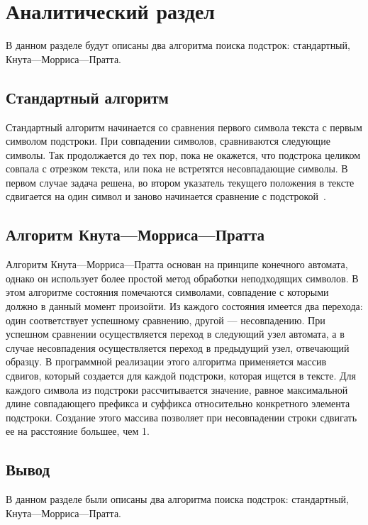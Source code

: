 \chapter{Аналитический раздел}

В данном разделе будут описаны два алгоритма поиска подстрок: стандартный, Кнута---Морриса---Пратта.

\section{Стандартный алгоритм}
Стандартный алгоритм начинается со сравнения первого символа текста с первым символом подстроки. 
При совпадении символов, сравниваются следующие символы. 
Так продолжается до тех пор, пока не окажется, что подстрока целиком совпала с отрезком текста, или пока не встретятся несовпадающие символы. 
В первом случае задача решена, во втором указатель текущего положения в тексте сдвигается на один символ и заново начинается сравнение с подстрокой~\cite{aa}.

\section{Алгоритм Кнута---Морриса---Пратта}
Алгоритм Кнута---Морриса---Пратта основан на принципе конечного автомата, однако он использует более простой метод обработки неподходящих символов.
В этом алгоритме состояния помечаются символами, совпадение с которыми должно в данный момент произойти. 
Из каждого состояния имеется два перехода: один соответствует успешному сравнению, другой --- несовпадению. 
При успешном сравнении осуществляется переход в следующий узел автомата, а в случае несовпадения осуществляется переход в предыдущий узел, отвечающий образцу. 
В программной реализации этого алгоритма применяется массив сдвигов, который создается для каждой подстроки, которая ищется в тексте.
Для каждого символа из подстроки рассчитывается значение, равное максимальной длине совпадающего префикса и суффикса относительно конкретного элемента подстроки. 
Создание этого массива позволяет при несовпадении строки сдвигать ее на расстояние большее, чем 1.


\section*{Вывод}

В данном разделе были описаны два алгоритма поиска подстрок: стандартный, Кнута---Морриса---Пратта.
